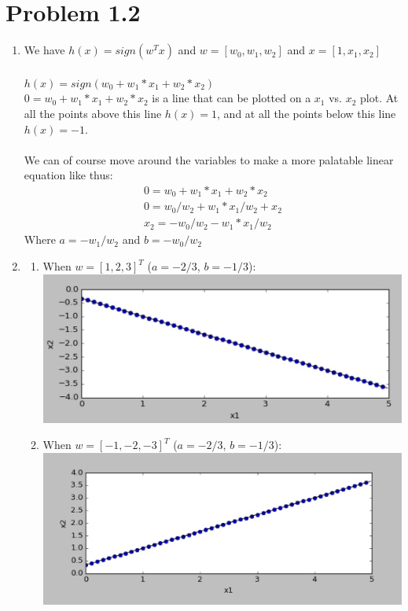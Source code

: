 \documentclass[12pt]{article}
\begin{document}
\section*{Problem 1.2}
\begin{enumerate}[label=(\alph*)]
	\item We have $h(x) = sign(w^T x)$ and $w = [w_0, w_1, w_2]$ and $x = [1, x_1, x_2]$
	\\ \\ $h(x) = sign(w_0 + w_1*x_1 + w_2*x_2)$
	\\ $0 = w_0 + w_1*x_1 + w_2*x_2$ is a line that can be plotted on a $x_1$ vs. $x_2$ plot. At all the points above this line $h(x) = 1$, and at all the points below this line $h(x) = -1$.
	\\ \\ We can of course move around the variables to make a more palatable linear equation like thus:
	\begin{gather*}
	0 = w_0 + w_1*x_1 + w_2*x_2
	\\ 0 = w_0/w_2 + w_1*x_1/w_2 + x_2 
	\\ x_2 = -w_0/w_2 - w_1*x_1/w_2
	\end{gather*}
	Where $a = -w_1/w_2$ and $b = -w_0/w_2$
	\item
	\begin{enumerate}
		\item When $w = [1, 2, 3]^T$ ($a = -2/3$, $b = -1/3$):
		\\ \includegraphics[scale=.5]{1-2-1.png}
		\item When $w = [-1, -2, -3]^T$ ($a = -2/3$, $b = -1/3$):
		\\ \includegraphics[scale=.5]{1-2-2.png}
	\end{enumerate}
\end{enumerate}
\end{document}
